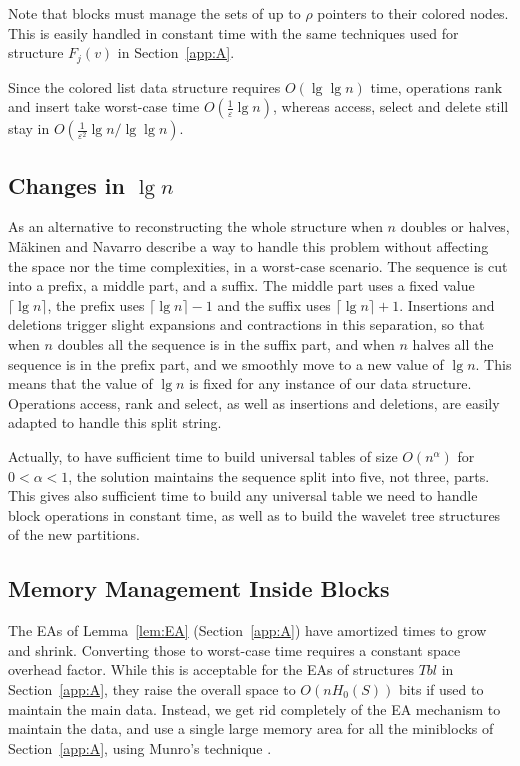 \documentclass[11pt]{article}
\def\idrm#1{\ensuremath{\mathrm{#1}}}
\newcommand{\ra}{\idrm{rank}}
\newcommand{\eps}{\varepsilon}
\begin{document}
Note that blocks must manage the sets of up to $\rho$ pointers to their
colored nodes. This is easily handled in constant time with the same
techniques used for structure $F_j(v)$ in Section~\ref{app:A}.

Since the colored list data structure requires $O(\lg\lg n)$ time,
operations $\ra$ and insert take worst-case time $O(\frac{1}{\eps}\lg n)$, 
whereas access, select and delete still stay in $O(\frac{1}{\eps^2}\lg n / \lg\lg n)$.

\subsection{Changes in $\lg n$}

As an alternative to reconstructing the whole structure when $n$ doubles
or halves, M\"akinen and
Navarro \cite{MN08} describe a way to handle this problem without affecting
the space nor the time complexities, in a worst-case scenario.
The sequence is cut into a prefix, a middle part, and a suffix. The middle
part uses a fixed value $\lceil \lg n\rceil$, the prefix uses $\lceil \lg n
\rceil-1$ and the suffix uses $\lceil \lg n\rceil+1$. Insertions and deletions
trigger slight expansions and contractions in this separation, so that when
$n$ doubles all the sequence is in the suffix part, and when $n$ halves all
the sequence is in the prefix part, and we smoothly move to a new value of
$\lg n$. This means that the value of $\lg n$ is fixed for any instance of our
data structure. Operations access, rank and select, as well as insertions
and deletions, are easily adapted to handle this split string.

Actually, to have sufficient time to build universal tables of size 
$O(n^\alpha)$ for $0<\alpha<1$, the solution \cite{MN08} maintains the sequence
split into five, not three, parts. This gives also sufficient time to build
any universal table we need to handle block operations in constant time, as
well as to build the wavelet tree structures of the new partitions.

\subsection{Memory Management Inside Blocks}

The EAs of Lemma~\ref{lem:EA} (Section~\ref{app:A})
have amortized times to grow and shrink.
Converting those to worst-case time requires a constant space overhead
factor. While this is acceptable for the EAs of structures $Tbl$ in 
Section~\ref{app:A}, they
raise the overall space to $O(nH_0(S))$ bits if used to maintain the main data.
Instead, we get rid completely of the EA mechanism to maintain the data, and 
use a single large memory area for all the miniblocks
of Section~\ref{app:A}, using Munro's technique \cite{Mun86}. 
\end{document}
